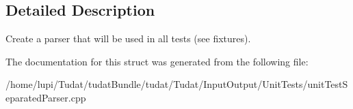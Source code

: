 \subsection{Detailed Description}
Create a parser that will be used in all tests (see fixtures). 

The documentation for this struct was generated from the following file\+:\begin{DoxyCompactItemize}
\item 
/home/lupi/\+Tudat/tudat\+Bundle/tudat/\+Tudat/\+Input\+Output/\+Unit\+Tests/unit\+Test\+Separated\+Parser.\+cpp\end{DoxyCompactItemize}
